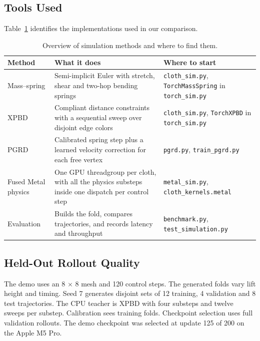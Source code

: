 \documentclass[sigconf]{acmart}
\begin{document}
\subsection{Tools Used}
Table~\ref{tab:methods} identifies the implementations used in our comparison.

\begin{table}[!htbp]
  \caption{Overview of simulation methods and where to find them.}
  \label{tab:methods}
  \footnotesize
  \raggedright
  \begin{tabular}{@{}p{} p{} p{}@{}}
    \toprule
    Method & What it does & Where to start \\
    \midrule
    Mass--spring &
      Semi-implicit Euler with stretch, shear and two-hop bending springs &
      \texttt{cloth\_\allowbreak sim.py}, \texttt{Torch\allowbreak Mass\allowbreak Spring} in \texttt{torch\_\allowbreak sim.py} \\
    XPBD &
      Compliant distance constraints with a sequential sweep over disjoint edge colors &
      \texttt{cloth\_\allowbreak sim.py}, \texttt{Torch\allowbreak XPBD} in \texttt{torch\_\allowbreak sim.py} \\
    PGRD &
      Calibrated spring step plus a learned velocity correction for each free vertex &
      \texttt{pgrd.py}, \texttt{train\_\allowbreak pgrd.py} \\
    Fused Metal physics &
      One GPU threadgroup per cloth, with all the physics substeps inside one dispatch per control step &
      \texttt{metal\_\allowbreak sim.py}, \texttt{cloth\_\allowbreak kernels.metal} \\
    Evaluation &
      Builds the fold, compares trajectories, and records latency and throughput &
      \texttt{benchmark.py}, \texttt{test\_\allowbreak simulation.py} \\
    \bottomrule
  \end{tabular}
\end{table}

\subsection{Held-Out Rollout Quality}

The demo uses an 8 $\times$ 8 mesh and 120 control steps. The generated folds vary lift height and timing. Seed 7 generates disjoint sets of 12 training, 4 validation and 8 test trajectories. The CPU teacher is XPBD with four substeps and twelve sweeps per substep. Calibration sees training folds. Checkpoint selection uses full validation rollouts. The demo checkpoint was selected at update 125 of 200 on the Apple M5 Pro.
\end{document}
